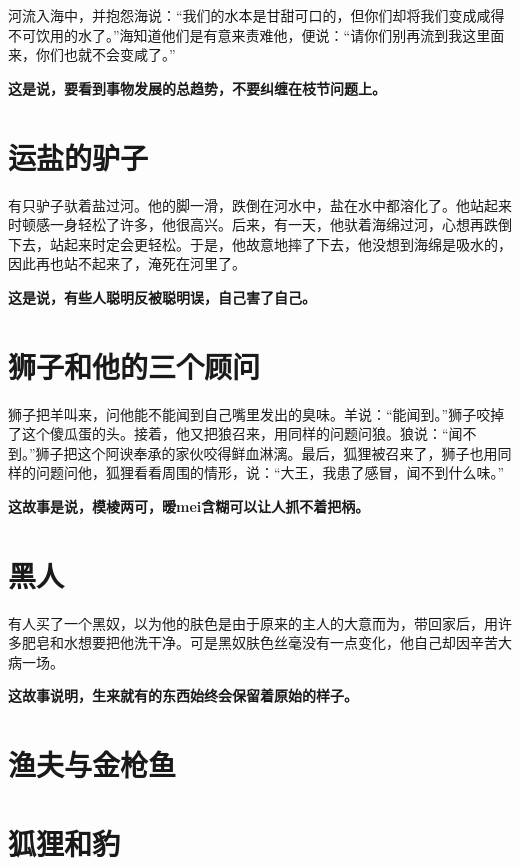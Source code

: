 河流入海中，并抱怨海说：“我们的水本是甘甜可口的，但你们却将我们变成咸得不可饮用的水了。”海知道他们是有意来责难他，便说：“请你们别再流到我这里面来，你们也就不会变咸了。”

{\bfseries \color{red}这是说，要看到事物发展的总趋势，不要纠缠在枝节问题上。}

\section{运盐的驴子}

有只驴子驮着盐过河。他的脚一滑，跌倒在河水中，盐在水中都溶化了。他站起来时顿感一身轻松了许多，他很高兴。后来，有一天，他驮着海绵过河，心想再跌倒下去，站起来时定会更轻松。于是，他故意地摔了下去，他没想到海绵是吸水的，因此再也站不起来了，淹死在河里了。

{\bfseries \color{red}这是说，有些人聪明反被聪明误，自己害了自己。}

\section{狮子和他的三个顾问}

狮子把羊叫来，问他能不能闻到自己嘴里发出的臭味。羊说：“能闻到。”狮子咬掉了这个傻瓜蛋的头。接着，他又把狼召来，用同样的问题问狼。狼说：“闻不到。”狮子把这个阿谀奉承的家伙咬得鲜血淋漓。最后，狐狸被召来了，狮子也用同样的问题问他，狐狸看看周围的情形，说：“大王，我患了感冒，闻不到什么味。”

{\bfseries \color{red}这故事是说，模棱两可，暧mei含糊可以让人抓不着把柄。}

\section{黑人}

有人买了一个黑奴，以为他的肤色是由于原来的主人的大意而为，带回家后，用许多肥皂和水想要把他洗干净。可是黑奴肤色丝毫没有一点变化，他自己却因辛苦大病一场。

{\bfseries \color{red}这故事说明，生来就有的东西始终会保留着原始的样子。}

\section{渔夫与金枪鱼}



{\bfseries \color{red}}

\section{狐狸和豹}

